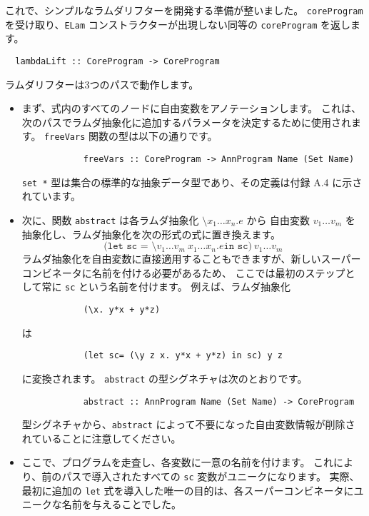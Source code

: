 \documentclass{jarticle}
\begin{document}
これで、シンプルなラムダリフターを開発する準備が整いました。
\texttt{coreProgram} を受け取り、\texttt{ELam} コンストラクターが出現しない同等の \texttt{coreProgram} を返します。

\begin{verbatim}
  lambdaLift :: CoreProgram -> CoreProgram
\end{verbatim}

ラムダリフターは3つのパスで動作します。

\begin{itemize}
	\item まず、式内のすべてのノードに自由変数をアノテーションします。
	      これは、次のパスでラムダ抽象化に追加するパラメータを決定するために使用されます。
	      \texttt{freeVars} 関数の型は以下の通りです。
	      \begin{verbatim}
            freeVars :: CoreProgram -> AnnProgram Name (Set Name)
          \end{verbatim}
	      \texttt{set *} 型は集合の標準的な抽象データ型であり、その定義は付録 A.4 に示されています。
	\item 次に、関数 \texttt{abstract} は各ラムダ抽象化 $\texttt{\textbackslash}x_1 \ldots x_n \texttt{.} e$ から
	      自由変数 $v_1 \ldots v_m$ を抽象化し、ラムダ抽象化を次の形式の式に置き換えます。
	      \[
		      \texttt{(let sc = \textbackslash}v_1 \ldots v_m ~ x_1 \ldots x_n \texttt{.} e \texttt{in sc}) ~ v_1 \ldots v_m
	      \]
	      ラムダ抽象化を自由変数に直接適用することもできますが、新しいスーパーコンビネータに名前を付ける必要があるため、
	      ここでは最初のステップとして常に \texttt{sc} という名前を付けます。
	      例えば、ラムダ抽象化
	      \begin{verbatim}
			(\x. y*x + y*z)
		  \end{verbatim}
	      は
	      \begin{verbatim}
			(let sc= (\y z x. y*x + y*z) in sc) y z
		  \end{verbatim}
	      に変換されます。
	      \texttt{abstract} の型シグネチャは次のとおりです。
	      \begin{verbatim}
        	abstract :: AnnProgram Name (Set Name) -> CoreProgram
          \end{verbatim}
	      型シグネチャから、\texttt{abstract} によって不要になった自由変数情報が削除されていることに注意してください。
	\item ここで、プログラムを走査し、各変数に一意の名前を付けます。
	      これにより、前のパスで導入されたすべての \texttt{sc} 変数がユニークになります。
	      実際、最初に追加の \texttt{let} 式を導入した唯一の目的は、各スーパーコンビネータにユニークな名前を与えることでした。

\end{itemize}
\end{document}
